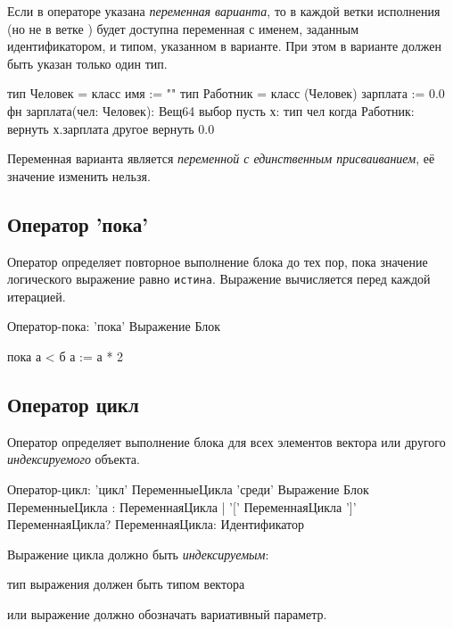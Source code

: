 Если в операторе указана \emph{переменная варианта}, то в каждой ветки исполнения 
(но не в ветке ) будет доступна переменная с именем, заданным идентификатором,
 и типом, указанном в варианте. При этом в варианте должен быть указан только один тип.
 
\begin{Trivil}
тип Человек = класс { имя := "" }
тип Работник = класс (Человек) {
    зарплата := 0.0
}
фн зарплата(чел: Человек): Вещ64 {
    выбор пусть х: тип чел { 
    когда Работник: вернуть х.зарплата
    другое вернуть 0.0
    }
}
\end{Trivil}

Переменная варианта является \emph{переменной с единственным присваиванием}, 
её значение изменить нельзя.

\hypertarget{while-stmt}{%
\subsection{Оператор 'пока' }\label{stmt:while-stmt}}

Оператор  определяет повторное выполнение блока до тех пор, пока значение логического выражение равно \verb+истина+. 
Выражение вычисляется перед каждой итерацией.

\begin{Grammar}
Оператор-пока: 'пока' Выражение Блок 
\end{Grammar}

\begin{Trivil}
пока а < б {
    а := а * 2
}
\end{Trivil}

\hypertarget{cycle-stmt}{%
\subsection{Оператор цикл }\label{stmt:cycle-stmt}}

Оператор  определяет выполнение блока для всех элементов вектора или другого \emph{индексируемого} объекта. 

\begin{Grammar}
Оператор-цикл: 
    'цикл'  ПеременныеЦикла 'среди' Выражение Блок 
ПеременныеЦикла
    : ПеременнаяЦикла
    | '[' ПеременнаяЦикла ']' ПеременнаяЦикла?
ПеременнаяЦикла: Идентификатор    
\end{Grammar}

Выражение цикла должно быть \emph{индексируемым}:
\begin{d_itemize}
\item
    тип выражения должен быть типом вектора 
\item
    или выражение должно обозначать вариативный параметр.
\end{d_itemize}

